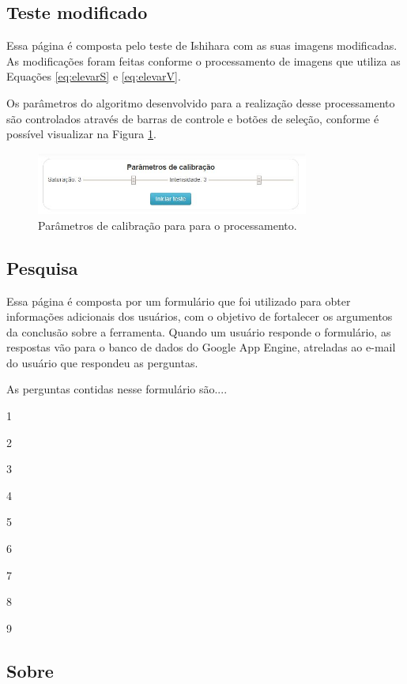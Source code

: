 \documentclass[	12pt, Times, openright, twoside, a4paper, english, brazil]{abntex2}
\begin{document}
\subsection{Teste modificado}

Essa página é composta pelo teste de Ishihara com as suas imagens modificadas. As modificações foram feitas conforme o processamento de imagens que utiliza as Equações \ref{eq:elevarS} e \ref{eq:elevarV}.

Os parâmetros do algoritmo desenvolvido para a realização desse processamento são controlados através de barras de controle e botões de seleção, conforme é possível visualizar na Figura \ref{fig:figuraParametrosTeste}. 

\begin{figure}[!htb]
\centering \includegraphics[width=0.8\textwidth]{figuraParametrosCalibracao.jpg}
\caption{Parâmetros de calibração para para o processamento.} \label{fig:figuraParametrosTeste}
\end{figure}




\subsection{Pesquisa}

Essa página é composta por um formulário que foi utilizado para obter informações adicionais dos usuários, com o objetivo de fortalecer os argumentos da conclusão sobre a ferramenta. Quando um usuário responde o formulário, as respostas vão para o banco de dados do Google App Engine, atreladas ao e-mail do usuário que respondeu as perguntas.


As perguntas contidas nesse formulário são....

1

2

3

4

5

6

7

8

9

\subsection{Sobre}
\end{document}
